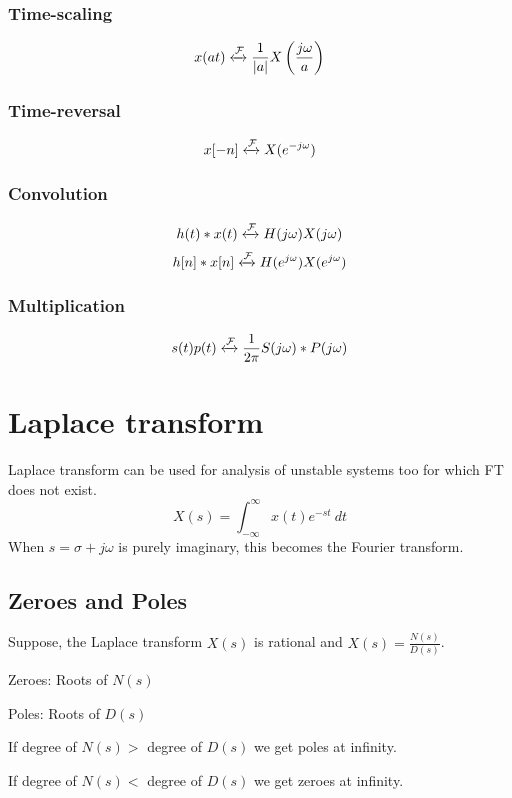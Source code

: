 \documentclass[10pt, a4paper]{extarticle}
\theoremstyle{definition}
\begin{document}
\subsubsection{Time-scaling}
\[x(at)\xleftrightarrow{\mathcal{F}}\frac{1}{|a|}X\left(\frac{j\omega}{a}\right)\]
\subsubsection{Time-reversal}
\[x[-n]\xleftrightarrow{\mathcal{F}}X(e^{-j\omega})\]
\subsubsection{Convolution}
\[h(t)*x(t)\xleftrightarrow{\mathcal{F}}H(j\omega)X(j\omega)\]
\[h[n]*x[n]\xleftrightarrow{\mathcal{F}}H(e^{j\omega})X(e^{j\omega})\]

\subsubsection{Multiplication}
\[s(t)p(t)\xleftrightarrow{\mathcal{F}}\frac{1}{2\pi}S(j\omega)*P(j\omega)\]

\section{Laplace transform}
Laplace transform can be used for analysis of unstable systems too for which FT does not exist.
\[X(s)=\int_{-\infty}^{\infty}x(t)e^{-st}\ dt\]
When $s=\sigma+j\omega$ is purely imaginary, this becomes the Fourier transform.
\subsection{Zeroes and Poles}
Suppose, the Laplace transform $X(s)$ is rational and $X(s)=\frac{N(s)}{D(s)}$.

Zeroes: Roots of $N(s)$

Poles: Roots of $D(s)$

If degree of $N(s)>$ degree of $D(s)$ we get poles at infinity.

If degree of $N(s)<$ degree of $D(s)$ we get zeroes at infinity.
\end{document}
